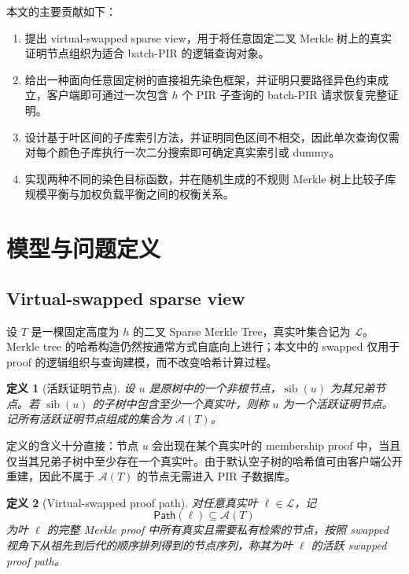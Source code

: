 \documentclass[UTF8]{ctexart}
\newtheorem{definition}{定义}[section]
\begin{document}
	本文的主要贡献如下：
	\begin{enumerate}[leftmargin=2em]
		\item 提出 virtual-swapped sparse view，用于将任意固定二叉 Merkle 树上的真实证明节点组织为适合 batch-PIR 的逻辑查询对象。
		\item 给出一种面向任意固定树的直接祖先染色框架，并证明只要路径异色约束成立，客户端即可通过一次包含 $h$ 个 PIR 子查询的 batch-PIR 请求恢复完整证明。
		\item 设计基于叶区间的子库索引方法，并证明同色区间不相交，因此单次查询仅需对每个颜色子库执行一次二分搜索即可确定真实索引或 dummy。
		\item 实现两种不同的染色目标函数，并在随机生成的不规则 Merkle 树上比较子库规模平衡与加权负载平衡之间的权衡关系。
	\end{enumerate}
	
	\section{模型与问题定义}
	
	\subsection{Virtual-swapped sparse view}
	
	设 $T$ 是一棵固定高度为 $h$ 的二叉 Sparse Merkle Tree，真实叶集合记为 $\mathcal{L}$。Merkle tree 的哈希构造仍然按通常方式自底向上进行；本文中的 swapped 仅用于 proof 的逻辑组织与查询建模，而不改变哈希计算过程。
	
	\begin{definition}[活跃证明节点]
		设 $u$ 是原树中的一个非根节点，$\operatorname{sib}(u)$ 为其兄弟节点。若 $\operatorname{sib}(u)$ 的子树中包含至少一个真实叶，则称 $u$ 为一个活跃证明节点。记所有活跃证明节点组成的集合为 $\mathcal{A}(T)$。
	\end{definition}
	
	定义的含义十分直接：节点 $u$ 会出现在某个真实叶的 membership proof 中，当且仅当其兄弟子树中至少存在一个真实叶。由于默认空子树的哈希值可由客户端公开重建，因此不属于 $\mathcal{A}(T)$ 的节点无需进入 PIR 子数据库。
	
	\begin{definition}[Virtual-swapped proof path]
		对任意真实叶 $\ell \in \mathcal{L}$，记
		\[
		\mathsf{Path}(\ell) \subseteq \mathcal{A}(T)
		\]
		为叶 $\ell$ 的完整 Merkle proof 中所有真实且需要私有检索的节点，按照 swapped 视角下从祖先到后代的顺序排列得到的节点序列，称其为叶 $\ell$ 的活跃 swapped proof path。
	\end{definition}
	
\end{document}

